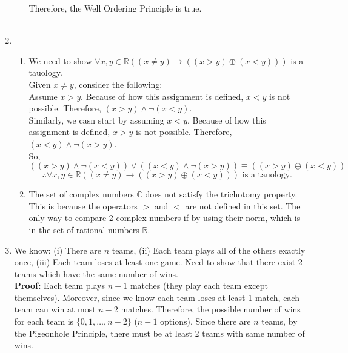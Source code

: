 \documentclass[a4paper]{article}
\begin{document}
\begin{enumerate}
\begin{enumerate}
        Therefore, the Well Ordering Principle is true. \\ \\
    \end{enumerate}

    \item \begin{enumerate}
        \item We need to show $\forall x, y \in \mathbb{R} ((x \ne y) \rightarrow ((x > y) \oplus (x < y)))$ is a tauology. \\
        Given $x \ne y$, consider the following: \\
        
        Assume $x > y$. Because of how this assignment is defined, $x < y$ is not possible. Therefore, $(x > y) \land \neg (x < y)$. \\

        Similarly, we casn start by assuming $x < y$. Because of how this assignment is defined, $x > y$ is not possible. Therefore, $(x < y) \land \neg (x > y)$. \\

        So, $((x > y) \land \neg (x < y)) \lor ((x < y) \land \neg (x > y)) \equiv ((x > y) \oplus (x < y))$
        \[\therefore \forall x, y \in \mathbb{R} ((x \ne y) \rightarrow ((x > y) \oplus (x < y))) \text{ is a tauology.}\]
        
        \item The set of complex numbers $\mathbb{C}$ does not satisfy the trichotomy property. This is because the operators $>$ and $<$ are not defined in this set. The only way to compare 2 complex numbers if by using their norm, which is in the set of rational numbers $\mathbb{R}$. \\
    \end{enumerate}

    \newpage
    \item We know: (i) There are $n$ teams, (ii) Each team plays all of the others exactly once, (iii) Each team loses at least one game. Need to show that there exist 2 teams which have the same number of wins. \\

    \textbf{Proof:}
    Each team plays $n-1$ matches (they play each team except themselves). Moreover, since we know each team loses at least 1 match, each team can win at most $n-2$ matches. Therefore, the possible number of wins for each team is $\{0, 1, \dots, n-2\}$ ($n-1$ options). Since there are $n$ teams, by the Pigeonhole Principle, there must be at least 2 teams with same number of wins. \\ \\



\end{enumerate}
\end{document}
